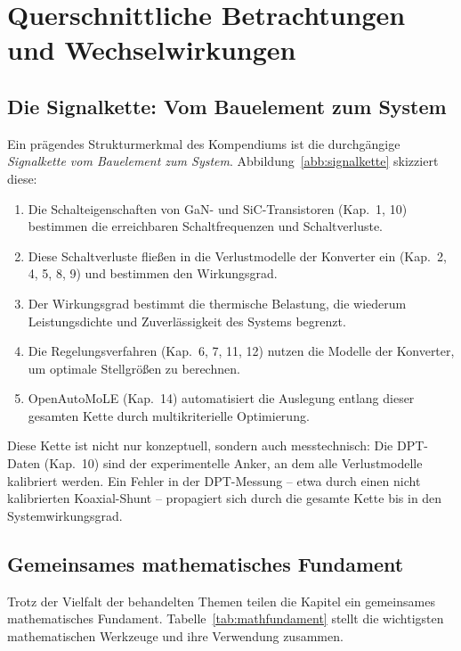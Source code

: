 ﻿\documentclass[a4paper,12pt,openany,oneside]{book}
\newcommand{\abschnitt}[1]{\section{#1}}
\newcommand{\unterabschnitt}[1]{\subsection{#1}}
\theoremstyle{definition}
\begin{document}
\abschnitt{Querschnittliche Betrachtungen und Wechselwirkungen}

\unterabschnitt{Die Signalkette: Vom Bauelement zum System}

Ein pr\"agendes Strukturmerkmal des Kompendiums ist die durchg\"angige \emph{Signalkette
vom Bauelement zum System}. Abbildung~\ref{abb:signalkette} skizziert diese:

\begin{enumerate}
  \item Die Schalteigenschaften von GaN- und SiC-Transistoren (Kap.\ 1, 10) bestimmen
    die erreichbaren Schaltfrequenzen und Schaltverluste.
  \item Diese Schaltverluste flie\ss{}en in die Verlustmodelle der Konverter ein
    (Kap.\ 2, 4, 5, 8, 9) und bestimmen den Wirkungsgrad.
  \item Der Wirkungsgrad bestimmt die thermische Belastung, die wiederum
    Leistungsdichte und Zuverl\"assigkeit des Systems begrenzt.
  \item Die Regelungsverfahren (Kap.\ 6, 7, 11, 12) nutzen die Modelle der Konverter,
    um optimale Stellgr\"o\ss{}en zu berechnen.
  \item OpenAutoMoLE (Kap.\ 14) automatisiert die Auslegung entlang dieser gesamten
    Kette durch multikriterielle Optimierung.
\end{enumerate}

Diese Kette ist nicht nur konzeptuell, sondern auch messtechnisch: Die DPT-Daten
(Kap.\ 10) sind der experimentelle Anker, an dem alle Verlustmodelle kalibriert werden.
Ein Fehler in der DPT-Messung -- etwa durch einen nicht kalibrierten Koaxial-Shunt --
propagiert sich durch die gesamte Kette bis in den Systemwirkungsgrad.

\unterabschnitt{Gemeinsames mathematisches Fundament}

Trotz der Vielfalt der behandelten Themen teilen die Kapitel ein gemeinsames
mathematisches Fundament. Tabelle~\ref{tab:mathfundament} stellt die wichtigsten
mathematischen Werkzeuge und ihre Verwendung zusammen.
\end{document}

